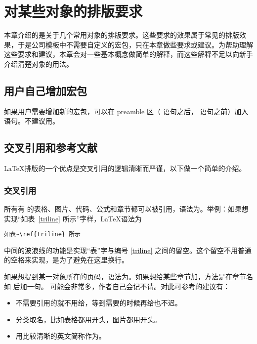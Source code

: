 \chapter{对某些对象的排版要求}
本章介绍的是关于几个常用对象的排版要求。这些要求的效果属于常见的排版效果，于是公司模板中不需要自定义的宏包，只在本章做些要求或建议。为帮助理解这些要求和建议，本章会对一些基本概念做简单的解释，而这些解释不足以向新手介绍清楚对象的用法。

\section{用户自己增加宏包}
如果用户需要增加新的宏包，可以在 preamble 区（ 语句之后， 语句之前）加入语句。不建议用。

\section{交叉引用和参考文献}
\LaTeX 排版的一个优点是交叉引用的逻辑清晰而严谨，以下做一个简单的介绍。

\subsection{交叉引用}
所有有 的表格、图片、代码、公式和章节都可以被引用，语法为。举例：如果想实现“如表~\ref{triline} 所示”字样，\LaTeX 语法为
\footnotesize\begin{verbatim}
如表~\ref{triline} 所示
\end{verbatim}
\normalsize
中间的波浪线的功能是实现“表”字与编号 \ref{triline} 之间的留空。这个留空不用普通的空格来实现，是为了避免在这里换行。

如果想提到某一对象所在的页码，语法为。如果想给某些章节加，方法是在章节名如 后加一句。 可能会非常多，作者自己会记不请。对此可参考的建议有：
\begin{itemize}
\item 不需要引用的就不用给，等到需要的时候再给也不迟。
\item 分类取名，比如表格都用开头，图片都用开头。
\item 用比较清晰的英文简称作为。
\end{itemize}

